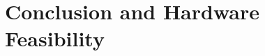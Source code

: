 \documentclass[journal]{IEEEtran}
\begin{document}
\section{Conclusion and Hardware Feasibility}            %

\appendices
{\raggedbottom
}



\end{document}
